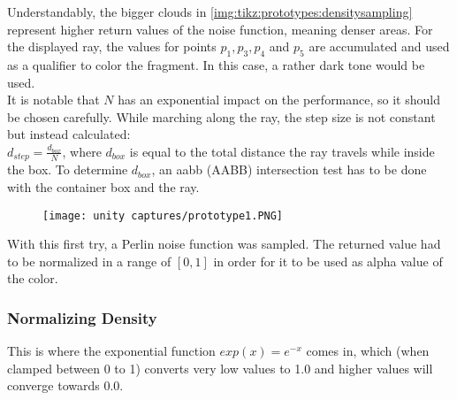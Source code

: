 \noindent
Understandably, the bigger clouds in \autoref{img:tikz:prototypes:densitysampling} represent higher return values of the noise function, meaning denser areas.
For the displayed ray, the values for points $p_1, p_3, p_4$ and $p_5$ are accumulated and used as a qualifier to color the fragment. In this case, a rather dark tone would be used.
\\
It is notable that $N$ has an exponential impact on the performance, so it should be chosen carefully.
\emptyline
While marching along the ray, the step size is not constant but instead calculated: \\
$ d_{step} = \frac{d_{box}}{N}$, where $d_{box}$ is equal to the total distance the ray travels while inside the box. To determine $d_{box}$, an \gls{aabb} (AABB) intersection test \cite{online:aabb} has to be done with the container box and the ray.

\begin{figure}[H]
    \centering
    \texttt{[image: unity captures/prototype1.PNG]}
    \label{img:captures:prototype1}
\end{figure}

\noindent
With this first try, a Perlin noise function was sampled. The returned value had to be normalized in a range of $[0, 1]$ in order for it to be used as alpha value of the color.

\subsubsection{Normalizing Density}
This is where the exponential function $exp(x) = e^{-x}$ comes in, which (when clamped between 0 to 1) converts very low values to 1.0 and higher values will converge towards 0.0.

